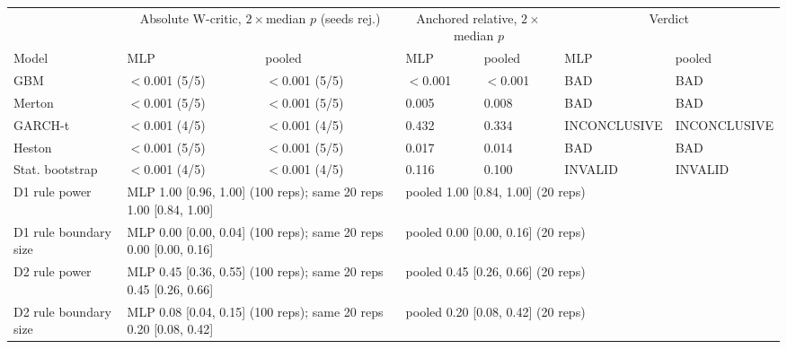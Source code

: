 \begin{tabular}{lllllll}
\toprule
 & \multicolumn{2}{c}{Absolute W-critic, $2\times$median $p$ (seeds rej.)} & \multicolumn{2}{c}{Anchored relative, $2\times$median $p$} & \multicolumn{2}{c}{Verdict} \\
\cmidrule(lr){2-3} \cmidrule(lr){4-5} \cmidrule(lr){6-7}
Model & MLP & pooled & MLP & pooled & MLP & pooled \\
\midrule
GBM & $<$0.001 (5/5) & $<$0.001 (5/5) & $<$0.001 & $<$0.001 & BAD & BAD \\
Merton & $<$0.001 (5/5) & $<$0.001 (5/5) & 0.005 & 0.008 & BAD & BAD \\
GARCH-t & $<$0.001 (4/5) & $<$0.001 (4/5) & 0.432 & 0.334 & INCONCLUSIVE & INCONCLUSIVE \\
Heston & $<$0.001 (5/5) & $<$0.001 (5/5) & 0.017 & 0.014 & BAD & BAD \\
Stat. bootstrap & $<$0.001 (4/5) & $<$0.001 (4/5) & 0.116 & 0.100 & INVALID & INVALID \\
\midrule
D1 rule power & \multicolumn{2}{l}{MLP 1.00 [0.96, 1.00] (100 reps); same 20 reps 1.00 [0.84, 1.00]} & \multicolumn{4}{l}{pooled 1.00 [0.84, 1.00] (20 reps)} \\
D1 rule boundary size & \multicolumn{2}{l}{MLP 0.00 [0.00, 0.04] (100 reps); same 20 reps 0.00 [0.00, 0.16]} & \multicolumn{4}{l}{pooled 0.00 [0.00, 0.16] (20 reps)} \\
D2 rule power & \multicolumn{2}{l}{MLP 0.45 [0.36, 0.55] (100 reps); same 20 reps 0.45 [0.26, 0.66]} & \multicolumn{4}{l}{pooled 0.45 [0.26, 0.66] (20 reps)} \\
D2 rule boundary size & \multicolumn{2}{l}{MLP 0.08 [0.04, 0.15] (100 reps); same 20 reps 0.20 [0.08, 0.42]} & \multicolumn{4}{l}{pooled 0.20 [0.08, 0.42] (20 reps)} \\
\bottomrule
\end{tabular}
